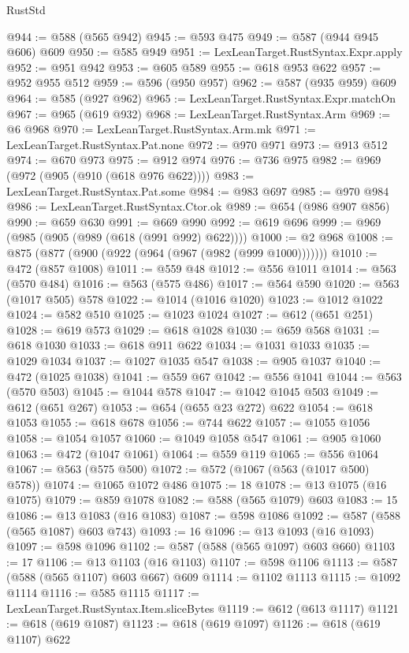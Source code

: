 \begin{lexlean}{RustStd}
\begin{coremodule}
@944 := @588 (@565 @942)
@945 := @593 @475
@949 := @587 (@944 @945 @606) @609
@950 := @585 @949
@951 := LexLeanTarget.RustSyntax.Expr.apply
@952 := @951 @942
@953 := @605 @589
@955 := @618 @953 @622
@957 := @952 @955 @512
@959 := @596 (@950 @957)
@962 := @587 (@935 @959) @609
@964 := @585 (@927 @962)
@965 := LexLeanTarget.RustSyntax.Expr.matchOn
@967 := @965 (@619 @932)
@968 := LexLeanTarget.RustSyntax.Arm
@969 := @6 @968
@970 := LexLeanTarget.RustSyntax.Arm.mk
@971 := LexLeanTarget.RustSyntax.Pat.none
@972 := @970 @971
@973 := @913 @512
@974 := @670 @973
@975 := @912 @974
@976 := @736 @975
@982 := @969 (@972 (@905 (@910 (@618 @976 @622))))
@983 := LexLeanTarget.RustSyntax.Pat.some
@984 := @983 @697
@985 := @970 @984
@986 := LexLeanTarget.RustSyntax.Ctor.ok
@989 := @654 (@986 @907 @856)
@990 := @659 @630
@991 := @669 @990
@992 := @619 @696
@999 := @969 (@985 (@905 (@989 (@618 (@991 @992) @622))))
@1000 := @2 @968
@1008 := @875 (@877 (@900 (@922 (@964 (@967 (@982 (@999 @1000)))))))
@1010 := @472 (@857 @1008)
@1011 := @559 @48
@1012 := @556 @1011
@1014 := @563 (@570 @484)
@1016 := @563 (@575 @486)
@1017 := @564 @590
@1020 := @563 (@1017 @505) @578
@1022 := @1014 (@1016 @1020)
@1023 := @1012 @1022
@1024 := @582 @510
@1025 := @1023 @1024
@1027 := @612 (@651 @251)
@1028 := @619 @573
@1029 := @618 @1028
@1030 := @659 @568
@1031 := @618 @1030
@1033 := @618 @911 @622
@1034 := @1031 @1033
@1035 := @1029 @1034
@1037 := @1027 @1035 @547
@1038 := @905 @1037
@1040 := @472 (@1025 @1038)
@1041 := @559 @67
@1042 := @556 @1041
@1044 := @563 (@570 @503)
@1045 := @1044 @578
@1047 := @1042 @1045 @503
@1049 := @612 (@651 @267)
@1053 := @654 (@655 @23 @272) @622
@1054 := @618 @1053
@1055 := @618 @678
@1056 := @744 @622
@1057 := @1055 @1056
@1058 := @1054 @1057
@1060 := @1049 @1058 @547
@1061 := @905 @1060
@1063 := @472 (@1047 @1061)
@1064 := @559 @119
@1065 := @556 @1064
@1067 := @563 (@575 @500)
@1072 := @572 (@1067 (@563 (@1017 @500) @578))
@1074 := @1065 @1072 @486
@1075 := 18
@1078 := @13 @1075 (@16 @1075)
@1079 := @859 @1078
@1082 := @588 (@565 @1079) @603
@1083 := 15
@1086 := @13 @1083 (@16 @1083)
@1087 := @598 @1086
@1092 := @587 (@588 (@565 @1087) @603 @743)
@1093 := 16
@1096 := @13 @1093 (@16 @1093)
@1097 := @598 @1096
@1102 := @587 (@588 (@565 @1097) @603 @660)
@1103 := 17
@1106 := @13 @1103 (@16 @1103)
@1107 := @598 @1106
@1113 := @587 (@588 (@565 @1107) @603 @667) @609
@1114 := @1102 @1113
@1115 := @1092 @1114
@1116 := @585 @1115
@1117 := LexLeanTarget.RustSyntax.Item.sliceBytes
@1119 := @612 (@613 @1117)
@1121 := @618 (@619 @1087)
@1123 := @618 (@619 @1097)
@1126 := @618 (@619 @1107) @622

\end{coremodule}
\end{lexlean}
